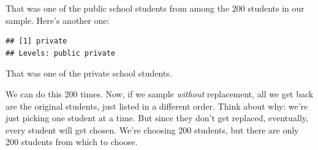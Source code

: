 \documentclass[
]{book}
\newenvironment{Shaded}{\begin{snugshade}}{\end{snugshade}}
\newcommand{\AttributeTok}[1]{\textcolor[rgb]{0.77,0.63,0.00}{#1}}
\newcommand{\DecValTok}[1]{\textcolor[rgb]{0.00,0.00,0.81}{#1}}
\newcommand{\FunctionTok}[1]{\textcolor[rgb]{0.00,0.00,0.00}{#1}}
\newcommand{\NormalTok}[1]{#1}
\newcommand{\OtherTok}[1]{\textcolor[rgb]{0.56,0.35,0.01}{#1}}
\newcommand{\SpecialCharTok}[1]{\textcolor[rgb]{0.00,0.00,0.00}{#1}}
\begin{document}
That was one of the public school students from among the 200 students in our sample. Here's another one:

\begin{Shaded}
\end{Shaded}

\begin{verbatim}
## [1] private
## Levels: public private
\end{verbatim}

That was one of the private school students.

We can do this 200 times. Now, if we sample \emph{without} replacement, all we get back are the original students, just listed in a different order. Think about why: we're just picking one student at a time. But since they don't get replaced, eventually, every student will get chosen. We're choosing 200 students, but there are only 200 students from which to choose.

\begin{Shaded}
\end{Shaded}
\end{document}

